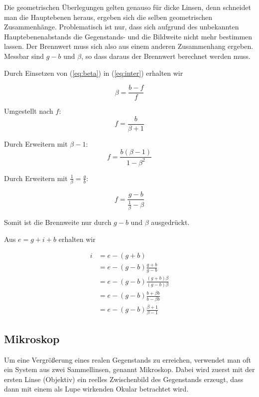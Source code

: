 \documentclass[a4paper,german,12pt,smallheadings]{scrartcl}
\begin{document}
Die geometrischen Überlegungen gelten genauso für dicke Linsen, denn schneidet
man die Hauptebenen heraus, ergeben sich die selben geometrischen
Zusammenhänge. Problematisch ist nur, dass sich aufgrund des unbekannten
Hauptebenenabstands die Gegenstands- und die Bildweite nicht mehr bestimmen
lassen. Der Brennwert muss sich also aus einem anderen Zusammenhang ergeben.
Messbar sind $g-b$ und $\beta$, so dass daraus der Brennwert berechnet werden
muss.

Durch Einsetzen von (\ref{eq:beta}) in (\ref{eq:inter}) erhalten wir

\begin{equation}
  \beta = \frac{b-f}{f}
\end{equation}

Umgestellt nach $f$:
\begin{equation}
  f = \frac{b}{\beta + 1}
\end{equation}

Durch Erweitern mit $\beta - 1$:
\begin{equation}
  f = \frac{b(\beta - 1)}{1-\beta^2}
\end{equation}

Durch Erweitern mit $\frac{1}{\beta} = \frac{g}{b}$:

\begin{equation}
  f = \frac{g - b}{\frac{1}{\beta} - \beta}
  \label{eq:dickebrennweite}
\end{equation}

Somit ist die Brennweite nur durch $g-b$ und $\beta$ ausgedrückt.

Aus $e = g + i + b$ erhalten wir

\begin{align*}
  i &= e - (g+b) \\
    &= e - (g-b) \frac{g+b}{g-b} \\
    &= e - (g-b) \frac{(g+b)\beta}{(g-b)\beta} \\
    &= e - (g-b) \frac{b + \beta b}{b - \beta b} \\
    &= e - (g-b) \frac{\beta + 1}{\beta - 1}
\end{align*}

\subsection{Mikroskop}
Um eine Vergrößerung eines realen Gegenstands zu erreichen, verwendet man oft
ein System aus zwei Sammellinsen, genannt Mikroskop. Dabei wird zuerst mit der
ersten Linse (Objektiv) ein reelles Zwischenbild des Gegenstands erzeugt, dass
dann mit einem als Lupe wirkenden Okular betrachtet wird.
\end{document}
